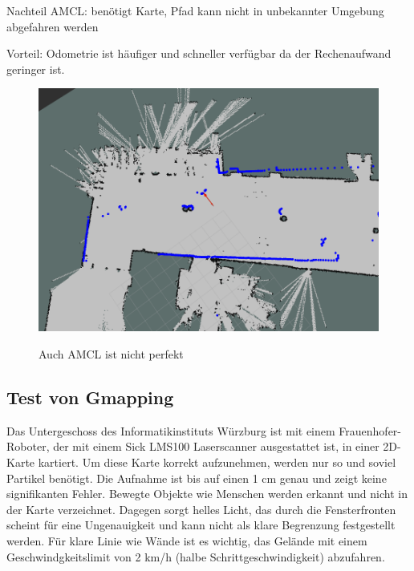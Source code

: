 \documentclass[11pt,a4paper]{article}
\begin{document}
{Nachteil AMCL: benötigt Karte, Pfad kann nicht in unbekannter Umgebung abgefahren werden

Vorteil: Odometrie ist h\"aufiger und schneller verf\"ugbar da der Rechenaufwand geringer ist. 

\begin{figure}[h]
	\centering
	{\includegraphics[width=\linewidth]{pictures/amcl_fail.png}}
	\caption{ Auch AMCL ist nicht perfekt \label{fig:amclFails}}
\end{figure}




\subsection{Test von Gmapping}
{
	Das Untergeschoss des Informatikinstituts W\"urzburg ist mit einem Frauenhofer-Roboter, der mit einem Sick LMS100 Laserscanner ausgestattet ist, in einer 2D-Karte kartiert.  Um diese Karte korrekt aufzunehmen, werden nur so und soviel Partikel ben\"otigt. Die Aufnahme ist bis auf einen 1 cm genau und zeigt keine signifikanten Fehler. Bewegte Objekte wie Menschen werden erkannt und nicht in der Karte verzeichnet. Dagegen sorgt helles Licht, das durch die Fensterfronten scheint f\"ur eine Ungenauigkeit und kann nicht als klare Begrenzung festgestellt werden. F\"ur klare Linie wie W\"ande ist es wichtig, das Gel\"ande mit einem Geschwindgkeitslimit von 2 km/h (halbe Schrittgeschwindigkeit) abzufahren.  
	
}}
\end{document}
